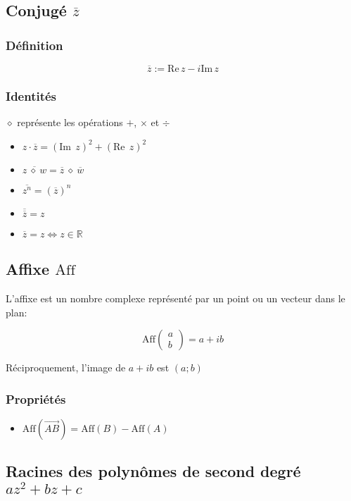 \documentclass{article}
\newcommand{\im}{\text{Im}\,}
\newcommand{\re}{\text{Re}\,}
\newcommand{\R}{\mathds{R}}
\newcommand{\conj}[1]{\overline{#1}}
\newcommand{\Aff}{\text{Aff}}
\newcommand{\placeholder}{\diamond}
\newcommand{\vect}[1]{\overrightarrow{#1}}
\begin{document}
\subsection{Conjugé $\conj{z}$}

\subsubsection{Définition}
\[\conj{z} := \re z - i\im z\]



\subsubsection{Identités}

$\placeholder$ représente les opérations $+$, $\times$ et $\div$

\begin{itemize}
    \item $z\cdot\conj{z} = (\im\; z)^2 + (\re\; z)^2$
    \item $\conj{z \:\placeholder\: w} = \conj{z} \:\placeholder\: \conj{w}$
    \item $\conj{z^n} = (\conj{z})^n$
    \item $\conj{\conj{z}} = z $
    \item $\conj{z} = z \iff z \in \R$
\end{itemize}

\subsection{Affixe $\Aff$}

L'affixe est un nombre complexe représenté par un point ou un vecteur dans le plan:

\[\Aff \begin{pmatrix} a \\ b \end{pmatrix} = a + ib\]

Réciproquement, l'image de $a+ib$ est $(a; b)$

\subsubsection{Propriétés}
\begin{itemize}
    \item $\Aff(\vect{AB}) = \Aff(B) - \Aff(A)$
\end{itemize}

\subsection{Racines des polynômes de second degré $az^2+bz+c$}
\end{document}
